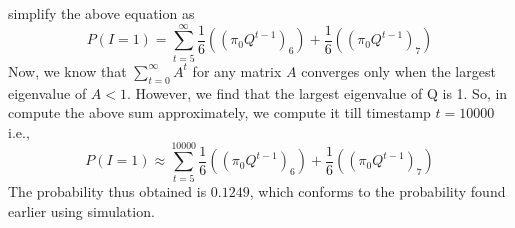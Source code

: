 \documentclass{article}
\begin{document}
\begin{enumerate}
        simplify the above equation as
        \begin{equation}
        \nonumber
            P(I=1) = \sum_{t=5}^{\infty} \frac{1}{6}((\pi_{0}Q^{t-1})_{6}) + \frac{1}{6}((\pi_{0}Q^{t-1})_{7})
        \end{equation}
        Now, we know that $\sum_{t=0}^{\infty} A^{t}$ for any matrix $A$ converges only when the largest eigenvalue of $A < 1$. However,
        we find that the largest eigenvalue of Q is 1. So, in compute the above sum approximately, we compute it till timestamp $t=10000$ i.e.,
        \begin{equation}
        \nonumber
            P(I=1) \approx \sum_{t=5}^{10000} \frac{1}{6}((\pi_{0}Q^{t-1})_{6}) + \frac{1}{6}((\pi_{0}Q^{t-1})_{7})
        \end{equation}
        The probability thus obtained is $0.1249$, which conforms to the probability found earlier using simulation. 
\end{enumerate}
\end{document}
